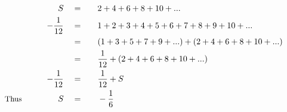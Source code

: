 \begin{alignat*}{5}
&\,&S\quad&=\quad&&2+4+6+8+10+...\\
&\,&-\frac{1}{12}\quad&=&&1+2+3+4+5+6+7+8+9+10+...\\
&\,&\,&=&&(1+3+5+7+9+...)+(2+4+6+8+10+...)\\
&\,&\,&=&&\frac{1}{12}+(2+4+6+8+10+...)\\
&\,&-\frac{1}{12}\quad&=&&\frac{1}{12}+S\\
&\small\text{Thus}\normalsize\qquad&S\quad&=&&-\frac{1}{6}
\end{alignat*}
